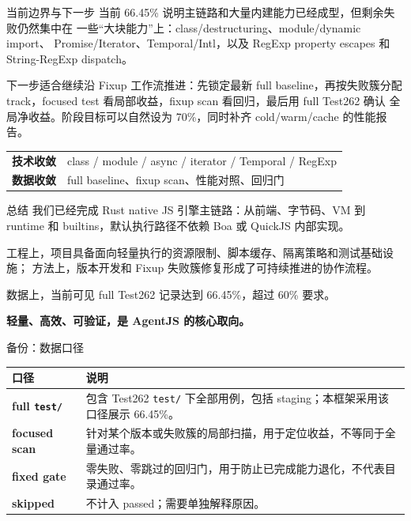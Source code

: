 \documentclass[aspectratio=169,UTF8,fontset=windows]{ctexbeamer}
\newcommand{\FullPassRate}{66.45\%}
\begin{document}
\begin{frame}{当前边界与下一步}
  当前 \FullPassRate{} 说明主链路和大量内建能力已经成型，但剩余失败仍然集中在
  一些“大块能力”上：class/destructuring、module/dynamic import、
  Promise/Iterator、Temporal/Intl，以及 RegExp property escapes 和
  String-RegExp dispatch。

  \vspace{0.7em}
  下一步适合继续沿 Fixup 工作流推进：先锁定最新 full baseline，再按失败簇分配
  track，focused test 看局部收益，fixup scan 看回归，最后用 full Test262 确认
  全局净收益。阶段目标可以自然设为 70\%，同时补齐 cold/warm/cache 的性能报告。

  \vspace{0.8em}
  \begin{tabularx}{\textwidth}{>{\bfseries}p{} X}
    \toprule
    技术收敛 & class / module / async / iterator / Temporal / RegExp \\
    数据收敛 & full baseline、fixup scan、性能对照、回归门 \\
    \bottomrule
  \end{tabularx}
\end{frame}

\begin{frame}{总结}
  我们已经完成 Rust native JS 引擎主链路：从前端、字节码、VM 到 runtime 和
  builtins，默认执行路径不依赖 Boa 或 QuickJS 内部实现。

  \vspace{0.5em}
  工程上，项目具备面向轻量执行的资源限制、脚本缓存、隔离策略和测试基础设施；
  方法上，版本开发和 Fixup 失败簇修复形成了可持续推进的协作流程。

  \vspace{0.5em}
  数据上，当前可见 full Test262 记录达到 \FullPassRate{}，超过 60\% 要求。

  \vspace{0.8em}
  \begin{center}
    {\Large\bfseries 轻量、高效、可验证，是 AgentJS 的核心取向。}
  \end{center}
\end{frame}

\appendix

\begin{frame}{备份：数据口径}
  \begin{tabularx}{\textwidth}{>{\bfseries}p{} X}
    \toprule
    口径 & 说明 \\
    \midrule
    full \texttt{test/} & 包含 Test262 \texttt{test/} 下全部用例，包括 staging；本框架采用该口径展示 \FullPassRate{}。 \\
    focused scan & 针对某个版本或失败簇的局部扫描，用于定位收益，不等同于全量通过率。 \\
    fixed gate & 零失败、零跳过的回归门，用于防止已完成能力退化，不代表目录通过率。 \\
    skipped & 不计入 passed；需要单独解释原因。 \\
    \bottomrule
  \end{tabularx}
\end{frame}
\end{document}
